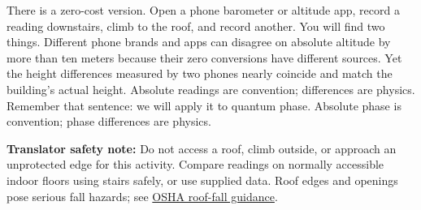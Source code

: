 \begin{mainline}
There is a zero-cost version. Open a phone barometer or altitude app, record a reading downstairs, climb to the roof, and record another. You will find two things. Different phone brands and apps can disagree on absolute altitude by more than ten meters because their zero conversions have different sources. Yet the height differences measured by two phones nearly coincide and match the building's actual height. Absolute readings are convention; differences are physics. Remember that sentence: we will apply it to quantum phase. Absolute phase is convention; phase differences are physics.

\textbf{Translator safety note:} Do not access a roof, climb outside, or approach an unprotected edge for this activity. Compare readings on normally accessible indoor floors using stairs safely, or use supplied data. Roof edges and openings pose serious fall hazards; see \href{https://www.osha.gov/green-jobs/solar/falls}{OSHA roof-fall guidance}.
\end{mainline}


